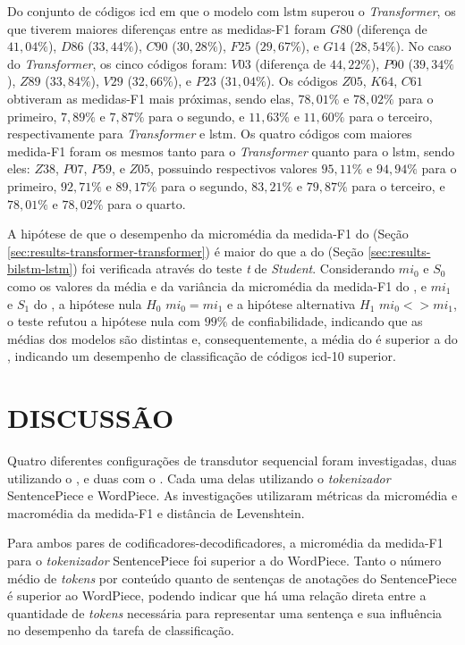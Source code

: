 Do conjunto de códigos \gls{icd} em que o modelo com \gls{lstm} superou o \textit{Transformer}, os que tiverem maiores diferenças entre as medidas-F1 foram $G80$ (diferença de $41,04\%$), $D86$ ($33,44\%$), $C90$ ($30,28\%$), $F25$ ($29,67\%$), e $G14$ ($28,54\%$). No caso do \textit{Transformer}, os cinco códigos foram: $V03$ (diferença de $44,22\%$), $P90$ ($39,34\%$), $Z89$ ($33,84\%$), $V29$ ($32,66\%$), e $P23$ ($31,04\%$). Os códigos $Z05$, $K64$, $C61$ obtiveram as medidas-F1 mais próximas, sendo elas, $78,01\%$ e $78,02\%$ para o primeiro, $7,89\%$ e $7,87\%$ para o segundo, e $11,63\%$ e $11,60\%$ para o terceiro, respectivamente para \textit{Transformer} e \gls{lstm}. Os quatro códigos com maiores medida-F1 foram os mesmos tanto para o \textit{Transformer} quanto para o \gls{lstm}, sendo eles: $Z38$, $P07$, $P59$, e $Z05$, possuindo respectivos valores $95,11\%$ e $94,94\%$ para o primeiro, $92,71\%$ e $89,17\%$ para o segundo, $83,21\%$ e $79,87\%$ para o terceiro, e $78,01\%$ e $78,02\%$ para o quarto.

A hipótese de que o desempenho da micromédia da medida-F1 do \xfmrxfmr{} (Seção \ref{sec:results-transformer-transformer}) é maior do que a do \lstmlstm{} (Seção \ref{sec:results-bilstm-lstm}) foi verificada através do teste \textit{t} de \textit{Student}. Considerando $mi_0$ e $S_0$ como os valores da média e da variância da micromédia da medida-F1 do \xfmrxfmr{}, e $mi_1$ e $S_1$ do \lstmlstm{}, a hipótese nula $H_0$ $mi_0 = mi_1$ e a hipótese alternativa $H_1$ $mi_0 <> mi_1$, o teste refutou a hipótese nula com $99\%$ de confiabilidade, indicando que as médias dos modelos são distintas e, consequentemente, a média do \xfmrxfmr{} é superior a do \lstmlstm{}, indicando um desempenho de classificação de códigos \gls{icd}-10 superior.

\section{DISCUSSÃO}
\label{sec:results-discussionn}

Quatro diferentes configurações de transdutor sequencial foram investigadas, duas utilizando o \xfmrxfmr{}, e duas com o \lstmlstm{}. Cada uma delas utilizando o \textit{tokenizador} SentencePiece e WordPiece. As investigações utilizaram métricas da micromédia e macromédia da medida-F1 e distância de Levenshtein.

Para ambos pares de codificadores-decodificadores, a micromédia da medida-F1 para o \textit{tokenizador} SentencePiece foi superior a do WordPiece. Tanto o número médio de \textit{tokens} por conteúdo quanto de sentenças de anotações do SentencePiece é superior ao WordPiece, podendo indicar que há uma relação direta entre a quantidade de \textit{tokens} necessária para representar uma sentença e sua influência no desempenho da tarefa de classificação.

